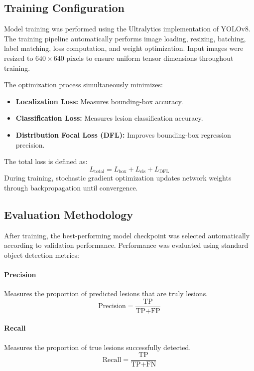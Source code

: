 \subsection{Training Configuration}
Model training was performed using the Ultralytics implementation of YOLOv8. The training pipeline automatically performs image loading, resizing, batching, label matching, loss computation, and weight optimization. Input images were resized to $640 \times 640$ pixels to ensure uniform tensor dimensions throughout training.

The optimization process simultaneously minimizes:
\begin{itemize}
	\item \textbf{Localization Loss:} Measures bounding-box accuracy.
	\item \textbf{Classification Loss:} Measures lesion classification accuracy.
	\item \textbf{Distribution Focal Loss (DFL):} Improves bounding-box regression precision.
\end{itemize}
The total loss is defined as:
\begin{equation}
	L_{\text{total}} = L_{\text{box}} + L_{\text{cls}} + L_{\text{DFL}}
\end{equation}
During training, stochastic gradient optimization updates network weights through backpropagation until convergence.

\subsection{Evaluation Methodology}
After training, the best-performing model checkpoint was selected automatically according to validation performance. Performance was evaluated using standard object detection metrics:

\paragraph{Precision} Measures the proportion of predicted lesions that are truly lesions.
\begin{equation}
	\text{Precision} = \frac{\text{TP}}{\text{TP} + \text{FP}}
\end{equation}

\paragraph{Recall} Measures the proportion of true lesions successfully detected.
\begin{equation}
	\text{Recall} = \frac{\text{TP}}{\text{TP} + \text{FN}}
\end{equation}

